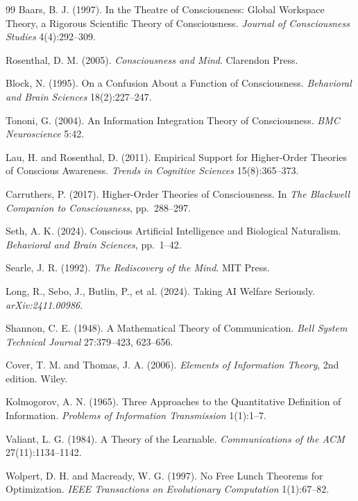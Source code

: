 \begin{thebibliography}{99}
Baars, B. J. (1997). In the Theatre of Consciousness: Global Workspace Theory,
a Rigorous Scientific Theory of Consciousness. \textit{Journal of Consciousness
Studies} 4(4):292--309.

Rosenthal, D. M. (2005). \textit{Consciousness and Mind}. Clarendon Press.

Block, N. (1995). On a Confusion About a Function of Consciousness.
\textit{Behavioral and Brain Sciences} 18(2):227--247.

Tononi, G. (2004). An Information Integration Theory of Consciousness.
\textit{BMC Neuroscience} 5:42.

Lau, H. and Rosenthal, D. (2011). Empirical Support for Higher-Order Theories
of Conscious Awareness. \textit{Trends in Cognitive Sciences} 15(8):365--373.

Carruthers, P. (2017). Higher-Order Theories of Consciousness. In
\textit{The Blackwell Companion to Consciousness}, pp.~288--297.

Seth, A. K. (2024). Conscious Artificial Intelligence and Biological
Naturalism. \textit{Behavioral and Brain Sciences}, pp.~1--42.

Searle, J. R. (1992). \textit{The Rediscovery of the Mind}. MIT Press.

Long, R., Sebo, J., Butlin, P., et al. (2024). Taking AI Welfare Seriously.
\textit{arXiv:2411.00986}.

Shannon, C. E. (1948). A Mathematical Theory of Communication.
\textit{Bell System Technical Journal} 27:379--423, 623--656.

Cover, T. M. and Thomas, J. A. (2006). \textit{Elements of Information Theory},
2nd edition. Wiley.

Kolmogorov, A. N. (1965). Three Approaches to the Quantitative Definition of
Information. \textit{Problems of Information Transmission} 1(1):1--7.

Valiant, L. G. (1984). A Theory of the Learnable. \textit{Communications of the
ACM} 27(11):1134--1142.

Wolpert, D. H. and Macready, W. G. (1997). No Free Lunch Theorems for
Optimization. \textit{IEEE Transactions on Evolutionary Computation}
1(1):67--82.


\end{thebibliography}
